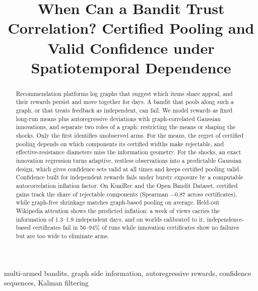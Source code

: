 \documentclass[conference]{IEEEtran}
\begin{document}
\title{When Can a Bandit Trust Correlation? Certified Pooling and Valid Confidence under Spatiotemporal Dependence}

\author{
}

\maketitle

\begin{abstract}
Recommendation platforms log graphs that suggest which items share appeal, and their rewards persist and move together for days. A bandit that pools along such a graph, or that treats feedback as independent, can fail. We model rewards as fixed long-run means plus autoregressive deviations with graph-correlated Gaussian innovations, and separate two roles of a graph: restricting the means or shaping the shocks. Only the first identifies unobserved arms. For the means, the regret of certified pooling depends on which components its certified widths make rejectable, and effective-resistance diameters miss the information geometry. For the shocks, an exact innovation regression turns adaptive, restless observations into a predictable Gaussian design, which gives confidence sets valid at all times and keeps certified pooling valid. Confidence built for independent rewards fails under bursty exposure by a computable autocorrelation inflation factor. On KuaiRec and the Open Bandit Dataset, certified gains track the share of rejectable components (Spearman $-0.87$ across certificates), while graph-free shrinkage matches graph-based pooling on average. Held-out Wikipedia attention shows the predicted inflation: a week of views carries the information of 1.3--1.9 independent days, and on worlds calibrated to it, independence-based certificates fail in 56--94\% of runs while innovation certificates show no failures but are too wide to eliminate arms.
\end{abstract}

\begin{IEEEkeywords}
multi-armed bandits, graph side information, autoregressive rewards, confidence sequences, Kalman filtering
\end{IEEEkeywords}

\end{document}
